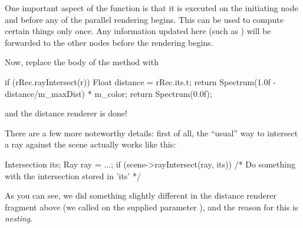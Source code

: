 One important aspect of the  function is that it is executed
on the initiating node and before any of the parallel rendering begins.
This can be used to compute certain things only once. Any
information updated here (such as ) will be forwarded to the
other nodes before the rendering begins.

Now, replace the body of the  method with
\begin{cpp}
    if (rRec.rayIntersect(r)) {
        Float distance = rRec.its.t;
        return Spectrum(1.0f - distance/m_maxDist) * m_color;
    }
    return Spectrum(0.0f);
\end{cpp}
and the distance renderer is done!
\begin{center}
\end{center}
There are a few more noteworthy details: first of all, the ``usual'' way
to intersect a ray against the scene actually works like this:
\begin{cpp}
    Intersection its;
    Ray ray = ...;
    if (scene->rayIntersect(ray, its)) {
        /* Do something with the intersection stored in 'its' */
    }
\end{cpp}
As you can see, we did something slightly different in the distance
renderer fragment above (we called 
on the supplied parameter ), and the reason for this is \emph{nesting}.
